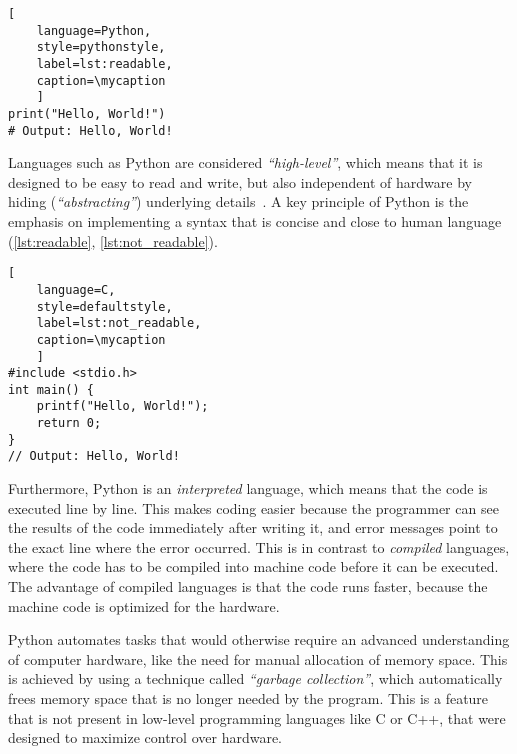 \def\mycaption{ Example of
    readable Python code. This one-line code returns the words (string)
    \texttt{'Hello, World!'} when executed. The command is straightforward and easy
    to understand.}
\begin{lstlisting}[
    language=Python, 
    style=pythonstyle,
    label=lst:readable,
    caption=\mycaption
    ]
print("Hello, World!")
# Output: Hello, World!
\end{lstlisting}

Languages such as Python are considered \textit{``high-level''}, which means
that it is designed to be easy to read and write, but also independent of
hardware by hiding (\textit{``abstracting''}) underlying
details~\cite{PythonLanguageReference2024}. A key principle of Python is the
emphasis on implementing a syntax that is concise and close to human language
(\autoref{lst:readable}, \autoref{lst:not_readable}).

\def\mycaption{ Example of less readable code written in the low-level
    programming language C. This code is doing exactly the same as the Python
    code in \autoref{lst:readable}. The command is harder to understand because
    more steps are needed to access the same functionality, including the
    definition of a function}
\begin{lstlisting}[
    language=C, 
    style=defaultstyle,
    label=lst:not_readable, 
    caption=\mycaption
    ]
#include <stdio.h>
int main() {
    printf("Hello, World!");
    return 0;
}
// Output: Hello, World!
\end{lstlisting}

Furthermore, Python is an \textit{interpreted} language, which means that the
code is executed line by line. This makes coding easier because the programmer
can see the results of the code immediately after writing it, and error messages
point to the exact line where the error occurred. This is in contrast to
\textit{compiled} languages, where the code has to be compiled into machine code
before it can be executed. The advantage of compiled languages is that the code
runs faster, because the machine code is optimized for the hardware.

Python automates tasks that would otherwise require an advanced understanding of
computer hardware, like the need for manual allocation of memory space. This is
achieved by using a technique called \textit{``garbage collection''}, which
automatically frees memory space that is no longer needed by the program. This
is a feature that is not present in low-level programming languages like C or
C++, that were designed to maximize control over hardware.

